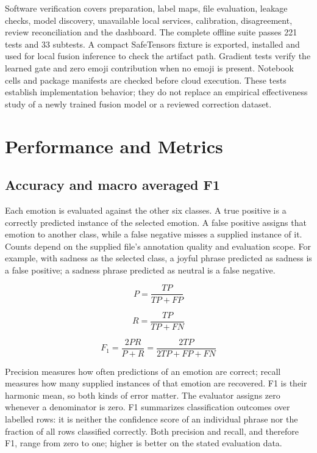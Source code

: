\documentclass[conference]{IEEEtran}
\begin{document}
Software verification covers preparation, label maps, file evaluation, leakage checks, model discovery, unavailable local services, calibration, disagreement, review reconciliation and the dashboard. The complete offline suite passes 221 tests and 33 subtests. A compact SafeTensors fixture is exported, installed and used for local fusion inference to check the artifact path. Gradient tests verify the learned gate and zero emoji contribution when no emoji is present. Notebook cells and package manifests are checked before cloud execution. These tests establish implementation behavior; they do not replace an empirical effectiveness study of a newly trained fusion model or a reviewed correction dataset.

\section{Performance and Metrics}

\subsection{Accuracy and macro averaged F1}

Each emotion is evaluated against the other six classes. A true positive is a correctly predicted instance of the selected emotion. A false positive assigns that emotion to another class, while a false negative misses a supplied instance of it. Counts depend on the supplied file's annotation quality and evaluation scope. For example, with sadness as the selected class, a joyful phrase predicted as sadness is a false positive; a sadness phrase predicted as neutral is a false negative.

\begin{equation}
P=\frac{TP}{TP+FP}
\label{eq:precision}
\end{equation}

\begin{equation}
R=\frac{TP}{TP+FN}
\label{eq:recall}
\end{equation}

\begin{equation}
F_1=\frac{2PR}{P+R}=\frac{2TP}{2TP+FP+FN}
\label{eq:f1}
\end{equation}

Precision measures how often predictions of an emotion are correct; recall measures how many supplied instances of that emotion are recovered. F1 is their harmonic mean, so both kinds of error matter. The evaluator assigns zero whenever a denominator is zero. F1 summarizes classification outcomes over labelled rows: it is neither the confidence score of an individual phrase nor the fraction of all rows classified correctly. Both precision and recall, and therefore F1, range from zero to one; higher is better on the stated evaluation data.
\end{document}

